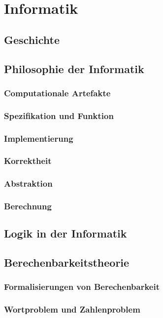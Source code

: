 \chapter{Informatik}

\section{Geschichte}

\section{Philosophie der Informatik}
\subsection{Computationale Artefakte}
\subsection{Spezifikation und Funktion}
\subsection{Implementierung}
\subsection{Korrektheit}
\subsection{Abstraktion}
\subsection{Berechnung}

\section{Logik in der Informatik}

\section{Berechenbarkeitstheorie}

\subsection{Formalisierungen von Berechenbarkeit}

\subsection{Wortproblem und Zahlenproblem}

